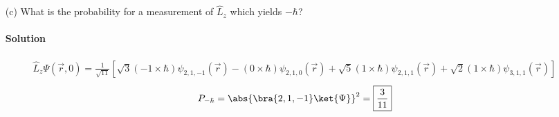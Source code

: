 \documentclass{article}
\numberwithin{equation}{section}
\begin{document}
\begin{enumerate}
		\item[(c)] What is the probability for a measurement of $\hat{L}_z$ which yields $-\hbar$?
		\paragraph{Solution}
		\begin{align}
            \hat{L}_z \Psi(\vec{r},0) = \frac{1}{\sqrt{11}} \left[ \sqrt{3} (-1 \times \hbar) \psi_{2,1,-1} (\vec{r}) - (0 \times \hbar) \psi_{2,1,0} (\vec{r}) + \sqrt{5} (1 \times \hbar) \psi_{2,1,1} (\vec{r}) + \sqrt{2} (1 \times \hbar) \psi_{3,1,1} (\vec{r}) \right]
        \end{align}
        \begin{align}
            P_{-\hbar} = \abs{ \bra{2,1,-1}\ket{\Psi} }^2 = \boxed{\frac{3}{11}}
        \end{align}
        
        
	\end{enumerate}
	
\end{document}

